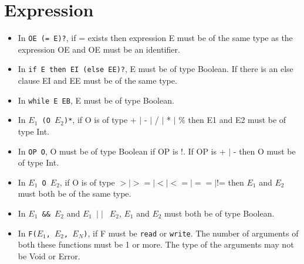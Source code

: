 \section{Expression}
\begin{itemize}

\item In \texttt{OE (= E)?}, if = exists then expression E must be of the same type as the expression OE and OE must be an identifier.

\item In \texttt{if E then EI (else EE)?}, E must be of type Boolean. If there is an else clause EI and EE must be of the same type.

\item In \texttt{while E EB}, E must be of type Boolean.

\item In \texttt{$E_1$ (O $E_2$)*}, if O is of type + $\mid$ - $\mid$ / $\mid$ * $\mid$ \% then E1 and E2 must be of type Int. 

\item In \texttt{OP O}, O must be of type Boolean if OP is !. If OP is + $\mid$ - then O must be of type Int. 

\item In \texttt{$E_1$ O $E_2$}, if O is of type $> \mid >= \mid < \mid <= \mid == \mid $!= then $E_1$ and $E_2$ must both be of the same type. 

\item In \texttt{$E_1$ \&\& $E_2$} and \texttt{$E_1$ $\mid\mid$ $E_2$}, $E_1$ and $E_2$ must both be of type Boolean. 

\item In \texttt{F($E_1$, $E_2$, $E_N$)}, if F must be \texttt{read} or \texttt{write}. The number of arguments of both these functions must be 1 or more. The type of the arguments may not be Void or Error.

\end{itemize}

